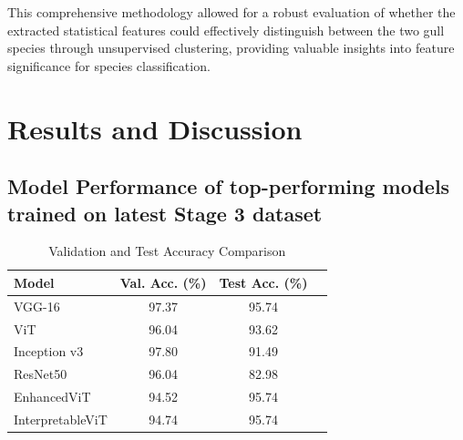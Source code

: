 \documentclass[a4paper,12pt]{report}
\begin{document}
This comprehensive methodology allowed for a robust evaluation of whether the extracted statistical features could effectively distinguish between the two gull species through unsupervised clustering, providing valuable insights into feature significance for species classification.

\chapter{Results and Discussion}\label{res:resultsfull}

\section{Model Performance of top-performing models trained on latest Stage 3 dataset}

\begin{table}[H]
    \centering
    \caption{Validation and Test Accuracy Comparison}
    \label{tab:val_test_comparison}
    \begin{tabular}{lccc}
    \toprule
    \textbf{Model} & \textbf{Val. Acc. (\%)} & \textbf{Test Acc. (\%)} \\
    \midrule
    VGG-16  & 97.37 & 95.74 \\
    ViT & 96.04 & 93.62 \\
    Inception v3 & 97.80 & 91.49  \\
    ResNet50 & 96.04 & 82.98 \\
    EnhancedViT & 94.52 & 95.74  \\
    InterpretableViT & 94.74 & 95.74 \\
    \bottomrule
    \end{tabular}
\end{table}
\end{document}
